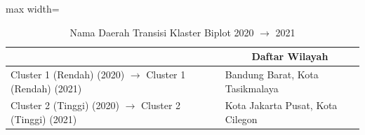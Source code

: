 \begin{table}[H]
\centering
\caption{Nama Daerah Transisi Klaster Biplot 2020 \(\rightarrow\) 2021} \label{tab:sample1biplot_trans_name_2020x2021}
\begin{adjustbox}{max width=\textwidth}
\begin{tabular}{|>{\centering\arraybackslash}p{4cm}|p{10cm}|}
\hline
\multicolumn{1}{|c|}{\textbf{Kategori}} & \multicolumn{1}{c|}{\textbf{Daftar Wilayah}} \\
\hline
Cluster 1 (Rendah) (2020) \(\rightarrow\) Cluster 1 (Rendah) (2021) & Bandung Barat, Kota Tasikmalaya \\
\hline
Cluster 2 (Tinggi) (2020) \(\rightarrow\) Cluster 2 (Tinggi) (2021) & Kota Jakarta Pusat, Kota Cilegon \\
\hline
\end{tabular}
\end{adjustbox}
\end{table}